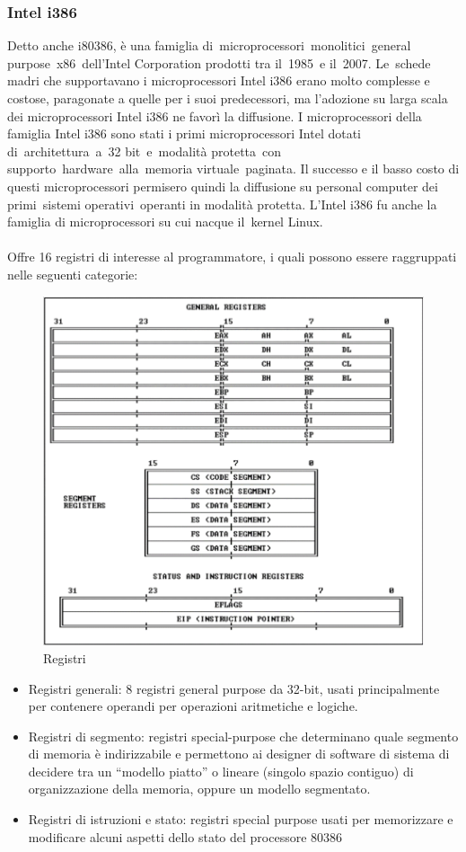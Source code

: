 \documentclass{article}
\begin{document}
\subsubsection{Intel i386}
Detto anche i80386, è una famiglia di microprocessori monolitici general purpose x86 dell'Intel Corporation 
prodotti tra il 1985 e il 2007. Le schede madri che supportavano i microprocessori Intel i386 erano 
molto complesse e costose, paragonate a quelle per i suoi predecessori, ma l'adozione su larga scala 
dei microprocessori Intel i386 ne favorì la diffusione. I microprocessori della famiglia Intel i386 
sono stati i primi microprocessori Intel dotati di architettura a 32 bit e modalità protetta con 
supporto hardware alla memoria virtuale paginata. Il successo e il basso costo di questi microprocessori 
permisero quindi la diffusione su personal computer dei primi sistemi operativi operanti in modalità 
protetta. L'Intel i386 fu anche la famiglia di microprocessori su cui nacque il kernel Linux.\\\\
Offre 16 registri di interesse al programmatore, i quali possono essere raggruppati nelle seguenti categorie:
\begin{figure}[H]
    \center
    \includegraphics[scale=0.3]{images/BO1.png}
    \caption{Registri}\label{fig:1}
\end{figure}
\begin{itemize}
    \item Registri generali: 8 registri general purpose da 32-bit, usati principalmente per contenere 
    operandi per operazioni aritmetiche e logiche.
    \item Registri di segmento: registri special-purpose che determinano quale segmento di memoria è 
    indirizzabile e permettono ai designer di software di sistema di decidere tra un “modello piatto” 
    o lineare (singolo spazio contiguo) di organizzazione della memoria, oppure un modello segmentato.
    \item Registri di istruzioni e stato: registri special purpose usati per memorizzare e modificare 
    alcuni aspetti dello stato del processore 80386
\end{itemize}
\end{document}

